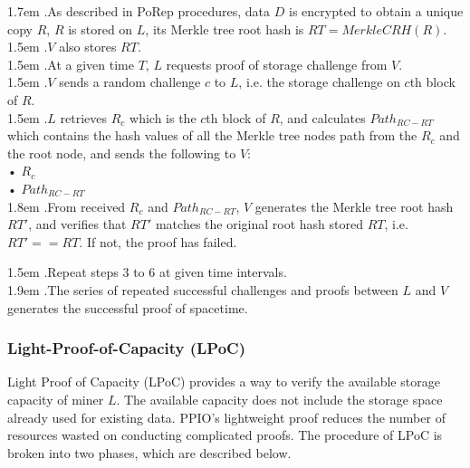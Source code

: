 \documentclass[10pt,a4paper]{article}
\begin{document}
\hangindent 1.7em
.\quad As described in PoRep procedures, data $D$ is encrypted to obtain a unique copy $R$, $R$ is stored on $L$, its Merkle tree root hash is $RT=MerkleCRH(R)$.
\vspace{-0.8em}
\\

\hangindent 1.5em
.\quad $V$ also stores $RT$.
\vspace{-0.8em}
\\

\hangindent 1.5em
.\quad At a given time $T$, $L$ requests proof of storage challenge from $V$.
\vspace{-0.8em}
\\

\hangindent 1.5em
.\quad $V$ sends a random challenge $c$ to $L$, i.e. the storage challenge on $c$th block of $R$.
\vspace{-0.8em}
\\

\hangindent 1.5em
.\quad $L$ retrieves $R_{c}$ which is the $c$th block of $R$, and calculates $Path_{RC-RT}$ which contains the hash values of all the Merkle tree nodes path from the $R_{c}$ and the root node, and sends the following to $V$:
 \\   •  $R_{c}$\\ 
   •  $Path_{RC-RT}$
   \vspace{-0.5em}
\\

\hangindent 1.8em
.\quad From received $R_{c}$ and $Path_{RC-RT}$, $V$ generates the Merkle tree root hash $RT'$, and verifies that $RT'$ matches the original root hash stored $RT$, i.e. $RT'==RT$. If not, the proof has failed.\\
\vspace{-0.8em}

\hangindent 1.5em
.\quad  Repeat steps 3 to 6 at given time intervals.
\vspace{-0.8em}
\\

\hangindent 1.9em
.\quad The series of repeated successful challenges and proofs between $L$ and $V$ generates the successful proof of spacetime.
\vspace{-0.5em}
        \subsubsection{Light-Proof-of-Capacity (LPoC)}  %
Light Proof of Capacity (LPoC) provides a way to verify the available storage capacity of miner $L$. The available capacity does not include the storage space already used for existing data. PPIO's lightweight proof reduces the number of resources wasted on conducting complicated proofs. The procedure of LPoC is broken into two phases, which are described below.
\vspace{-0.5em}
\\
\end{document}
